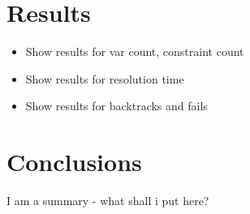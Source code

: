 \documentclass[english,biblatex]{lni}
\begin{document}
\section{Results}

\begin{itemize}
\item Show results for var count, constraint count
\item Show results for resolution time
\item Show results for backtracks and fails
\end{itemize}

\section{Conclusions}

I am a summary - what shall i put here?

\printbibliography[heading=bibintoc]
\end{document}
